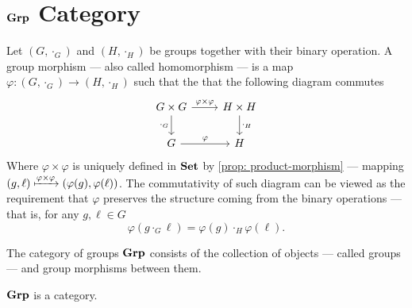 \section{\texorpdfstring{\({\textbf{Grp}}\)}{Grp} Category}

\begin{definition}\label{def: grp-morphism}
Let \((G, \cdot_G)\) and \((H, \cdot_H)\) be groups together with their binary
operation. A group morphism --- also called homomorphism --- is a map \(\varphi:
(G, \cdot_G) \to (H, \cdot_H)\) such that the that the following diagram
commutes
\[
  \begin{tikzcd}
    G \times G \ar[d, swap, "\cdot_G"] \ar[r, "\varphi \times \varphi"]
    &H \times H \ar[d, "\cdot_H"] \\
    G \ar[r, "\varphi"] &H
  \end{tikzcd}
\]
Where \(\varphi \times \varphi\) is uniquely defined in \({\textbf{Set}}\) by
\cref{prop: product-morphism} --- mapping \((g, \ell) \xmapsto{\varphi \times
\varphi} (\varphi(g), \varphi(\ell))\). The commutativity of such diagram can
be viewed as the requirement that \(\varphi\) preserves the structure coming
from the binary operations --- that is, for any \(g, \ell \in G\)
\[
  \varphi(g \cdot_G \ell) = \varphi(g) \cdot_H \varphi(\ell).
\]
\end{definition}

\begin{definition}\label{def: grp}
The category of groups \({\textbf{Grp}}\) consists of the collection of objects ---
called groups --- and group morphisms between them.
\end{definition}

\begin{proposition}
\({\textbf{Grp}}\) is a category.
\end{proposition}

